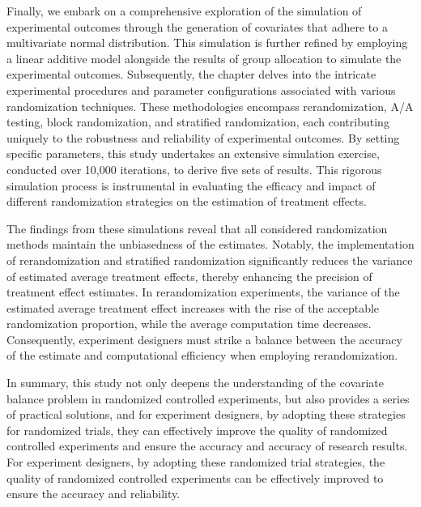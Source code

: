 \begin{digest}
Finally, we embark on a comprehensive exploration of the simulation of experimental outcomes through the generation of covariates  that adhere to a multivariate normal distribution. This simulation is further refined by employing a linear additive model alongside the results of group allocation to simulate the experimental outcomes. Subsequently, the chapter delves into the intricate experimental procedures and parameter configurations associated with various randomization techniques. These methodologies encompass rerandomization, A/A testing, block randomization, and stratified randomization, each contributing uniquely to the robustness and reliability of experimental outcomes. By setting specific parameters, this study undertakes an extensive simulation exercise, conducted over 10,000 iterations, to derive five sets of  results. This rigorous simulation process is instrumental in evaluating the efficacy and impact of different randomization strategies on the estimation of treatment effects.

The findings from these simulations reveal that all considered randomization methods maintain the unbiasedness of the  estimates. Notably, the implementation of rerandomization and stratified randomization significantly reduces the variance of estimated average treatment effects, thereby enhancing the precision of treatment effect estimates. In rerandomization experiments, the variance of the estimated average treatment effect increases with the rise of the acceptable randomization proportion, while the average computation time decreases. Consequently, experiment designers must strike a balance between the accuracy of the estimate and computational efficiency when employing rerandomization.

In summary, this study not only deepens the understanding of the covariate balance problem in randomized controlled experiments, but also provides a
series of practical solutions, and for experiment designers, by adopting these strategies for randomized trials, they can effectively improve the quality of randomized controlled experiments and ensure the accuracy and accuracy of research results.
For experiment designers, by adopting these randomized trial strategies, the quality of randomized controlled experiments can be effectively improved to ensure the accuracy and reliability.



\end{digest}
